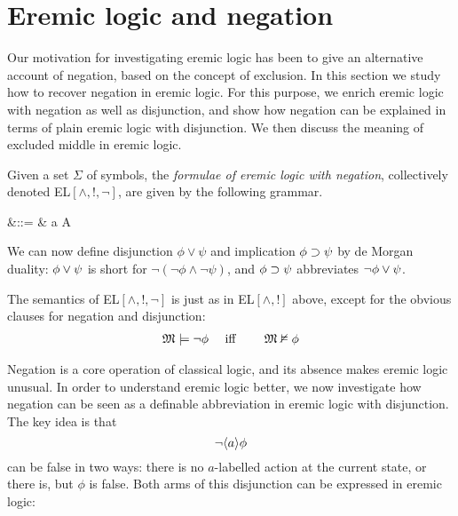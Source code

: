 \section{Eremic logic and negation}

Our motivation for investigating eremic logic has been to give an
alternative account of negation, based on the concept of exclusion.
In this section we study how to recover negation in eremic logic. For
this purpose, we enrich eremic logic with negation as well as
disjunction, and show how negation can be explained in terms of plain
eremic logic with disjunction. We then discuss the meaning of excluded
middle in eremic logic.

\begin{definition}
Given a set $\Sigma$ of symbols, the \emph{formulae of eremic logic
  with negation}, collectively denoted EL$[\land, !, \neg]$, are given
by the following grammar.

\begin{GRAMMAR}
  \phi 
     &\quad ::= \quad & 
   \top \fOr \bot \fOr \neg \phi \fOr \phi \land \psi \fOr \langle a \rangle \phi \fOr \fBang A 
\end{GRAMMAR}

\NI We can now define disjunction $\phi \lor \psi$ and implication
$\phi \supset \psi$ by de Morgan duality: $\phi \lor \psi$ is short
for $\neg (\neg \phi \land \neg \psi )$, and $\phi \supset \psi$  abbreviates
$\neg\phi \lor \psi$.
\end{definition}

The semantics of EL$[\land, !, \neg]$ is just as in EL$[\land, !]$
above, except for the obvious clauses for negation and disjunction:
\begin{eqnarray*}
\frak{M} \models \neg \phi &\quad\mbox{ iff }\quad& \frak{M} \nvDash \phi  
\end{eqnarray*}


Negation is a core operation of classical logic, and its absence makes
eremic logic unusual. In order to understand eremic logic better, we
now investigate how negation can be seen as a definable abbreviation
in eremic logic with disjunction. The key idea is that 
\[
   \neg \langle a \rangle \phi
\]
can be false in two ways: there is no $a$-labelled action at the
current state, or there is, but $\phi$ is false. Both arms of this
disjunction can be expressed in eremic logic:

